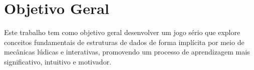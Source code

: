 \section{Objetivo Geral}

Este trabalho tem como objetivo geral desenvolver um jogo sério \cite{mouaheb2012serious} que explore conceitos fundamentais de estruturas de dados de forma implícita por meio de mecânicas lúdicas e interativas, promovendo um processo de aprendizagem mais significativo, intuitivo e motivador.
